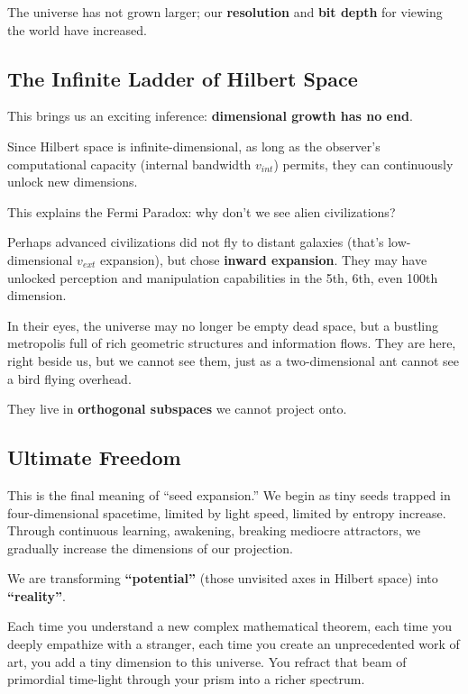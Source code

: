 \documentclass[11pt,a4paper,twoside]{book}
\begin{document}
The universe has not grown larger; our \textbf{resolution} and \textbf{bit depth} for viewing the world have increased.

\subsection{The Infinite Ladder of Hilbert Space}

This brings us an exciting inference: \textbf{dimensional growth has no end}.

Since Hilbert space is infinite-dimensional, as long as the observer's computational capacity (internal bandwidth $v_{int}$) permits, they can continuously unlock new dimensions.

This explains the Fermi Paradox: why don't we see alien civilizations?

Perhaps advanced civilizations did not fly to distant galaxies (that's low-dimensional $v_{ext}$ expansion), but chose \textbf{inward expansion}. They may have unlocked perception and manipulation capabilities in the 5th, 6th, even 100th dimension.

In their eyes, the universe may no longer be empty dead space, but a bustling metropolis full of rich geometric structures and information flows. They are here, right beside us, but we cannot see them, just as a two-dimensional ant cannot see a bird flying overhead.

They live in \textbf{orthogonal subspaces} we cannot project onto.

\subsection{Ultimate Freedom}

This is the final meaning of ``seed expansion.'' We begin as tiny seeds trapped in four-dimensional spacetime, limited by light speed, limited by entropy increase. Through continuous learning, awakening, breaking mediocre attractors, we gradually increase the dimensions of our projection.

We are transforming \textbf{``potential''} (those unvisited axes in Hilbert space) into \textbf{``reality''}.

Each time you understand a new complex mathematical theorem, each time you deeply empathize with a stranger, each time you create an unprecedented work of art, you add a tiny dimension to this universe. You refract that beam of primordial time-light through your prism into a richer spectrum.
\end{document}
